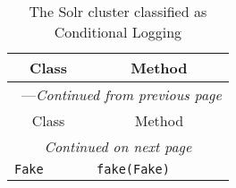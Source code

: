 \begin{center}
\begin{longtable}{ll}
\caption{The Solr cluster classified as Conditional Logging}\\
\toprule\multicolumn{1}{c}{Class}&\multicolumn{1}{c}{Method}\\\midrule
\endfirsthead

\multicolumn{2}{c}{\tablename\ \thetable{}---\textit{Continued from previous page}} \\\midrule
\multicolumn{1}{c}{Class}&\multicolumn{1}{c}{Method}\\\midrule
\endhead
\multicolumn{2}{c}{\textit{Continued on next page}}\\\midrule
\endfoot
\bottomrule
\endlastfoot
\lstinline/Fake/&{\lstinline/fake(Fake)/}\\
\end{longtable}
\end{center}


